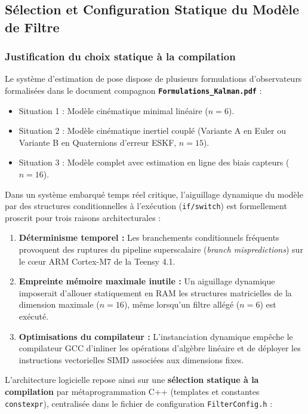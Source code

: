 \documentclass[../Implementation.tex]{subfiles}
\begin{document}
\subsection{Sélection et Configuration Statique du Modèle de Filtre}

\subsubsection{Justification du choix statique à la compilation}
Le système d'estimation de pose dispose de plusieurs formulations d'observateurs formalisées dans le document compagnon \textbf{\texttt{Formulations\_Kalman.pdf}} :
\begin{itemize}
    \item Situation 1 : Modèle cinématique minimal linéaire ($n = 6$).
    \item Situation 2 : Modèle cinématique inertiel couplé (Variante A en Euler ou Variante B en Quaternions d'erreur ESKF, $n = 15$).
    \item Situation 3 : Modèle complet avec estimation en ligne des biais capteurs ($n = 16$).
\end{itemize}

Dans un système embarqué temps réel critique, l'aiguillage dynamique du modèle par des structures conditionnelles à l'exécution (\lstinline|if/switch|) est formellement proscrit pour trois raisons architecturales :
\begin{enumerate}
    \item \textbf{Déterminisme temporel :} Les branchements conditionnels fréquents provoquent des ruptures du pipeline superscalaire (\textit{branch mispredictions}) sur le cœur ARM Cortex-M7 de la Teensy 4.1.
    \item \textbf{Empreinte mémoire maximale inutile :} Un aiguillage dynamique imposerait d'allouer statiquement en RAM les structures matricielles de la dimension maximale ($n=16$), même lorsqu'un filtre allégé ($n=6$) est exécuté.
    \item \textbf{Optimisations du compilateur :} L'instanciation dynamique empêche le compilateur GCC d'inliner les opérations d'algèbre linéaire et de déployer les instructions vectorielles SIMD associées aux dimensions fixes.
\end{enumerate}

L'architecture logicielle repose ainsi sur une \textbf{sélection statique à la compilation} par métaprogrammation C++ (templates et constantes \lstinline|constexpr|), centralisée dans le fichier de configuration \lstinline|FilterConfig.h| :
\end{document}
